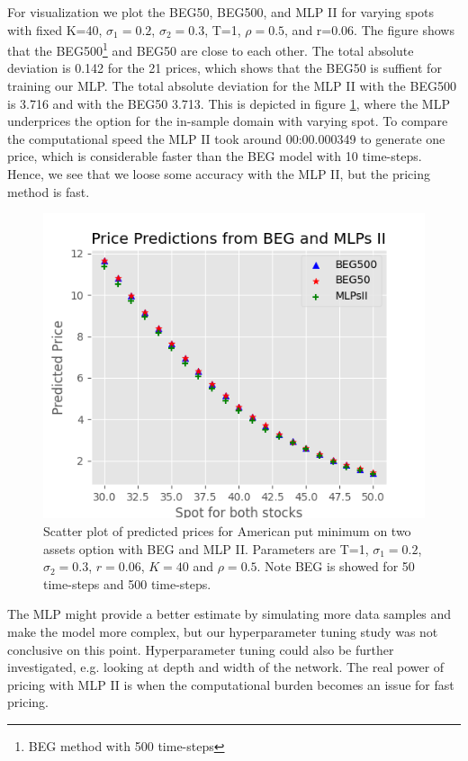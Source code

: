 For visualization we plot the BEG50, BEG500, and MLP II for varying spots with fixed K=40, $\sigma_1=0.2$, $\sigma_2=0.3$, T=1, $\rho=0.5$,  and r=0.06. The figure shows that the BEG500\footnote{BEG method with 500 time-steps} and BEG50 are close to each other. The total absolute deviation is 0.142 for the 21 prices, which shows that the BEG50 is suffient for training our MLP. The total absolute deviation for the MLP II with the BEG500 is 3.716 and with the BEG50 3.713. This is depicted in figure \ref{fig:BEGMLPII}, where the MLP underprices the option for the in-sample domain with varying spot. To compare the computational speed the MLP II took around 00:00.000349 to generate one price, which is considerable faster than the BEG model with 10 time-steps. Hence, we see that we loose some accuracy with the MLP II, but the pricing method is fast. 

\begin{figure}[H]
\centering
\includegraphics{Figures/compareBEGMLPsII.png}
\decoRule
\caption[Compare BEG and MLP II]{Scatter plot of predicted prices for American put minimum on two assets option with BEG and MLP II. Parameters are T=1, $\sigma_1=0.2$, $\sigma_2=0.3$, $r=0.06$, $K=40$ and $\rho=0.5$. Note BEG is showed for 50 time-steps and 500 time-steps.}
\label{fig:BEGMLPII}
\end{figure}

The MLP might provide a better estimate by simulating more data samples and make the model more complex, but our hyperparameter tuning study was not conclusive on this point. Hyperparameter tuning could also be further investigated, e.g. looking at depth and width of the network. The real power of pricing with MLP II is when the computational burden becomes an issue for fast pricing. 

